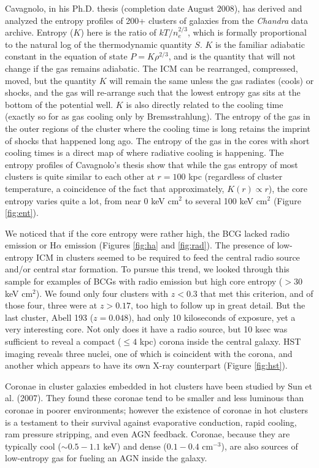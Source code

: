 \documentclass[letterpaper,11pt]{article}
\begin{document}
Cavagnolo, in his Ph.D. thesis (completion date August 2008), has derived
and analyzed the entropy profiles of 200+ clusters of galaxies from the
{\it{Chandra}} data archive. Entropy ($K$) here is the ratio of
$kT/n_{e}^{2/3}$, which is formally proportional to the natural log of
the thermodynamic quantity $S$. $K$ is the familiar adiabatic
constant in the equation of state $P=K\rho^{2/3}$, and is the
quantity that will not change if the gas remains adiabatic. The ICM
can be rearranged, compressed, moved, but the quantity $K$ will remain
the same unless the gas radiates (cools) or shocks, and the gas will
re-arrange such that the lowest entropy gas sits at the bottom of the
potential well. $K$ is also directly related to the cooling time
(exactly so for as gas cooling only by Bremsstrahlung). The entropy of
the gas in the outer regions of the cluster where the cooling time is
long retains the imprint of shocks that happened long ago. The
entropy of the gas in the cores with short cooling times is a direct
map of where radiative cooling is happening. The entropy profiles of
Cavagnolo's thesis show that while the gas entropy of most clusters is quite
similar to each other at $r=100$ kpc (regardless of cluster
temperature, a coincidence of the fact that approximately, $K(r)
\propto r$), the core entropy varies quite a lot, from near 0 keV
cm$^2$ to several 100 keV cm$^2$ (Figure \ref{fig:ent}).

We noticed that if the core entropy were rather high, the BCG lacked
radio emission or H$\alpha$ emission (Figures \ref{fig:ha} and
\ref{fig:rad}). The presence of low-entropy ICM in clusters seemed to
be required to feed the central radio source and/or central star
formation. To pursue this trend, we looked through this sample for
examples of BCGs with radio emission but high core entropy ($>30$ keV
cm$^2$). We found only four clusters with $z<0.3$ that met this
criterion, and of those four, three were at $z>0.17$, too high to follow up in
great detail. But the last cluster, Abell 193 ($z=0.048$), had only 10
kiloseconds of exposure, yet a very interesting core. Not only does it
have a radio source, but 10 ksec was sufficient to reveal a compact
($\leq 4$ kpc) corona inside the central galaxy. HST imaging
reveals three nuclei, one of which is coincident with the corona,
and another which appears to have its own X-ray counterpart (Figure
\ref{fig:hst}).

Coronae in cluster galaxies embedded in hot clusters have been studied
by Sun et al. (2007). They found these coronae tend to be smaller and
less luminous than coronae in poorer environments; however the
existence of coronae in hot clusters is a testament to their survival
against evaporative conduction, rapid cooling, ram pressure stripping,
and even AGN feedback. Coronae, because they are typically cool
($\sim0.5-1.1$ keV) and dense ($0.1-0.4$ cm$^{-3}$), are also sources
of low-entropy gas for fueling an AGN inside the galaxy.
\end{document}
